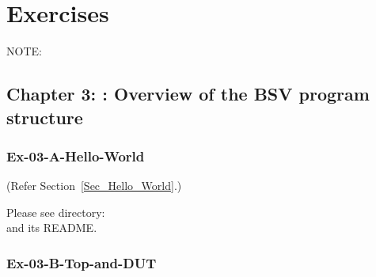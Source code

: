 

\chapter{Exercises}


\setcounter{page}{1}
\renewcommand{\thepage}{\Alph{chapter}-\arabic{page}}

\label{apx_exercises}


NOTE: 

\vspace{5ex}



\hdivider

\section*{Chapter 3: {\BSV}: Overview of the BSV program structure}


\subsection*{Ex-03-A-Hello-World}
\label{Ex-03-A-Hello-World}

(Refer Section~\ref{Sec_Hello_World}.)

Please see directory:  \\
and its README.


\subsection*{Ex-03-B-Top-and-DUT}
\label{Ex-03-B-Top-and-DUT}

